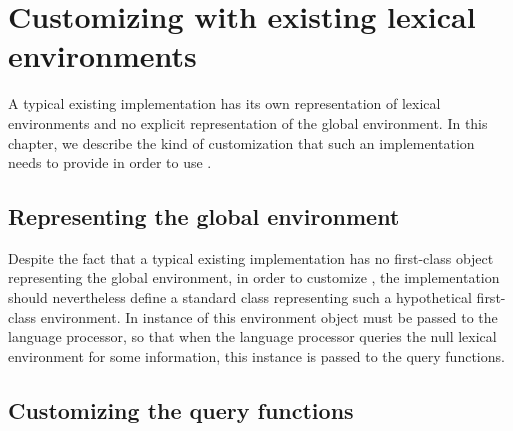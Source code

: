\chapter{Customizing with existing lexical environments}

A typical existing \commonlisp{} implementation has its own
representation of lexical environments and no explicit representation
of the global environment.  In this chapter, we describe the kind of
customization that such an implementation needs to provide in order to
use \sysname{}.

\section{Representing the global environment}

Despite the fact that a typical existing implementation has no
first-class object representing the global environment, in order to
customize \sysname{}, the implementation should nevertheless define a
standard class representing such a hypothetical first-class
environment.  In instance of this environment object must be passed to
the language processor, so that when the language processor queries
the null lexical environment for some information, this instance is
passed to the query functions.

\section{Customizing the query functions}

